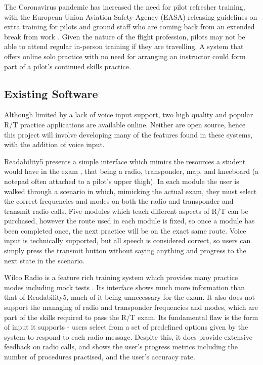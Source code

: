 The Coronavirus pandemic has increased the need for pilot refresher training, with the European Union Aviation Safety Agency (EASA) releasing guidelines on extra training for pilots and ground staff who are coming back from an extended break from work \cite{EASA-Training-Post-Covid}. Given the nature of the flight profession, pilots may not be able to attend regular in-person training if they are travelling. A system that offers online solo practice with no need for arranging an instructor could form part of a pilot’s continued skills practice.

\subsection{Existing Software}
Although limited by a lack of voice input support, two high quality and popular R/T practice applications are available online. Neither are open source, hence this project will involve developing many of the features found in these systems, with the addition of voice input.

Readability5 presents a simple interface which mimics the resources a student would have in the exam \cite{Readability5}, that being a radio, transponder, map, and kneeboard (a notepad often attached to a pilot's upper thigh). In each module the user is walked through a scenario in which, mimicking the actual exam, they must select the correct frequencies and modes on both the radio and transponder and transmit radio calls. Five modules which teach different aspects of R/T can be purchased, however the route used in each module is fixed, so once a module has been completed once, the next practice will be on the exact same route. Voice input is technically supported, but all speech is considered correct, so users can simply press the transmit button without saying anything and progress to the next state in the scenario.

Wilco Radio is a feature rich training system which provides many practice modes including mock tests \cite{Wilco-Radio}. Its interface shows much more information than that of Readability5, much of it being unnecessary for the exam. It also does not support the managing of radio and transponder frequencies and modes, which are part of the skills required to pass the R/T exam. Its fundamental flaw is the form of input it supports - users select from a set of predefined options given by the system to respond to each radio message. Despite this, it does provide extensive feedback on radio calls, and shows the user's progress metrics including the number of procedures practised, and the user's accuracy rate.

